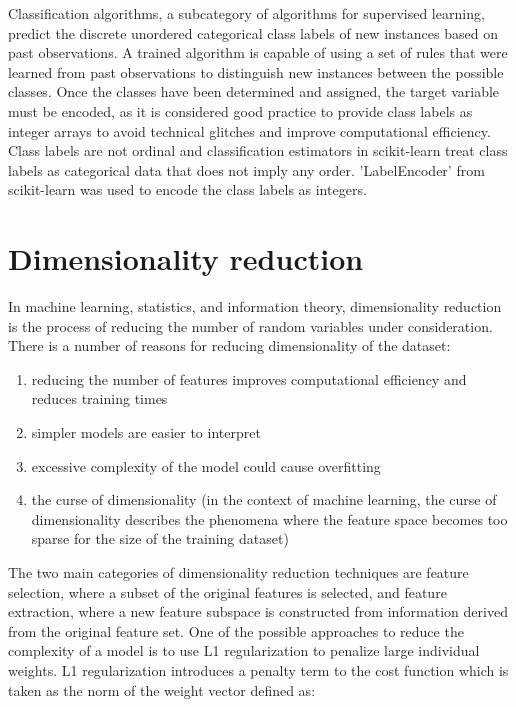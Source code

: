 Classification algorithms, a subcategory of algorithms for supervised learning, predict the discrete unordered categorical class labels of new instances based on past observations.
A trained algorithm is capable of using a set of rules that were learned from past observations to distinguish new instances between the possible classes.
Once the classes have been determined and assigned, the target variable must be encoded, as it is considered good practice to provide class labels as integer arrays to avoid technical glitches and improve computational efficiency.
Class labels are not ordinal and classification estimators in scikit-learn treat class labels as categorical data that does not imply any order.
'LabelEncoder' from scikit-learn was used to encode the class labels as integers.

\section{Dimensionality reduction} \label{sec:dimensionality_reduction}

In machine learning, statistics, and information theory, dimensionality reduction is the process of reducing the number of random variables under consideration.
There is a number of reasons for reducing dimensionality of the dataset:
\begin{enumerate}
    \item reducing the number of features improves computational efficiency and reduces training times
    \item simpler models are easier to interpret\cite{James2013}
    \item excessive complexity of the model could cause overfitting\cite{RaschkaMirjalili2017}
    \item the curse of dimensionality\cite{Bellman1954} (in the context of machine learning, the curse of dimensionality describes the phenomena where the feature space becomes too sparse for the size of the training dataset)\cite{RaschkaMirjalili2017}
\end{enumerate}

The two main categories of dimensionality reduction techniques are feature selection, where a subset of the original features is selected, and feature extraction, where a new feature subspace is constructed from information derived from the original feature set.
One of the possible approaches to reduce the complexity of a model is to use L1 regularization to penalize large individual weights.
L1 regularization introduces a penalty term to the cost function which is taken as the norm of the weight vector defined as:

